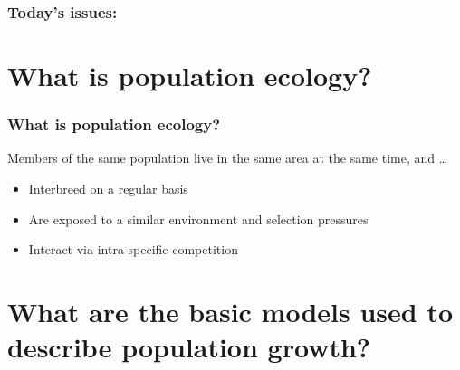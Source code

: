 \begin{noheadline}
\begin{frame}
\frametitle{Today's issues:}
\vspace{5mm}
\tableofcontents
\end{frame}
\end{noheadline}

\section{What is population ecology?}

\begin{frame}
    \frametitle{What is population ecology?}
    \begin{adjustwidth}{-2em}{-1.5em}
        Members of the same population live in the same area at the
        same time, and \ldots

        \begin{itemize}
            \item Interbreed on a regular basis

                \vspace{5mm}
            \item Are exposed to a similar environment and selection pressures

                \vspace{5mm}
            \item Interact via intra-specific competition
        \end{itemize}
    \end{adjustwidth}
\end{frame}

\section[Basic models of population growth]{What are the basic models used to describe population growth?}

